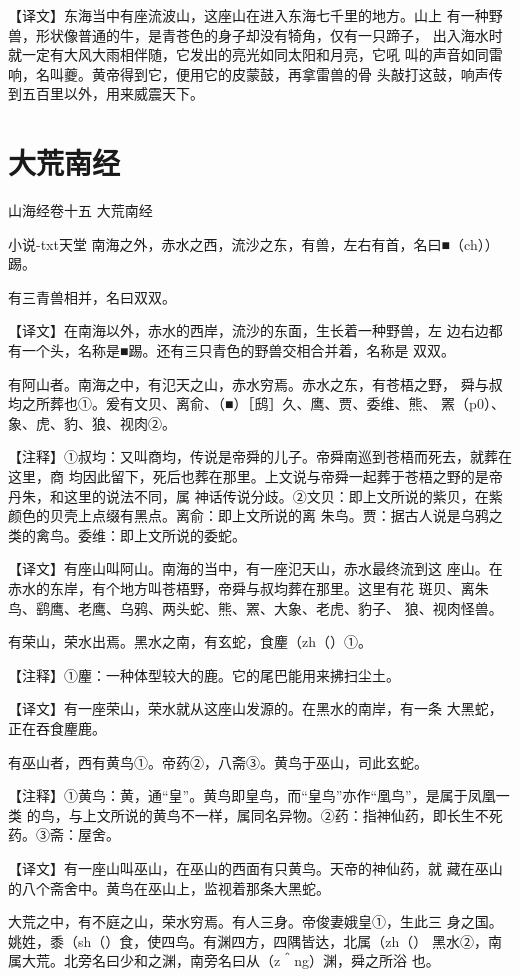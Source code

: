 \documentclass[a4paper,12pt,UTF8,twoside]{ctexbook}
\begin{document}
【译文】东海当中有座流波山，这座山在进入东海七千里的地方。山上 有一种野兽，形状像普通的牛，是青苍色的身子却没有犄角，仅有一只蹄子， 出入海水时就一定有大风大雨相伴随，它发出的亮光如同太阳和月亮，它吼 叫的声音如同雷响，名叫夔。黄帝得到它，便用它的皮蒙鼓，再拿雷兽的骨 头敲打这鼓，响声传到五百里以外，用来威震天下。

\chapter{大荒南经}

山海经卷十五 大荒南经

小说-txt天堂
南海之外，赤水之西，流沙之东，有兽，左右有首，名曰■（ch））踢。

有三青兽相并，名曰双双。

【译文】在南海以外，赤水的西岸，流沙的东面，生长着一种野兽，左 边右边都有一个头，名称是■踢。还有三只青色的野兽交相合并着，名称是 双双。

有阿山者。南海之中，有氾天之山，赤水穷焉。赤水之东，有苍梧之野， 舜与叔均之所葬也①。爰有文贝、离俞、（■）［鸱］久、鹰、贾、委维、熊、 罴（p0）、象、虎、豹、狼、视肉②。

【注释】①叔均：又叫商均，传说是帝舜的儿子。帝舜南巡到苍梧而死去，就葬在这里，商 均因此留下，死后也葬在那里。上文说与帝舜一起葬于苍梧之野的是帝丹朱，和这里的说法不同，属 神话传说分歧。②文贝：即上文所说的紫贝，在紫颜色的贝壳上点缀有黑点。离俞：即上文所说的离 朱鸟。贾：据古人说是乌鸦之类的禽鸟。委维：即上文所说的委蛇。

【译文】有座山叫阿山。南海的当中，有一座氾天山，赤水最终流到这 座山。在赤水的东岸，有个地方叫苍梧野，帝舜与叔均葬在那里。这里有花 斑贝、离朱鸟、鹞鹰、老鹰、乌鸦、两头蛇、熊、罴、大象、老虎、豹子、 狼、视肉怪兽。

有荣山，荣水出焉。黑水之南，有玄蛇，食麈（zh（）①。

【注释】①麈：一种体型较大的鹿。它的尾巴能用来拂扫尘土。

【译文】有一座荣山，荣水就从这座山发源的。在黑水的南岸，有一条 大黑蛇，正在吞食麈鹿。

有巫山者，西有黄鸟①。帝药②，八斋③。黄鸟于巫山，司此玄蛇。

【注释】①黄鸟：黄，通“皇”。黄鸟即皇鸟，而“皇鸟”亦作“凰鸟”，是属于凤凰一类 的鸟，与上文所说的黄鸟不一样，属同名异物。②药：指神仙药，即长生不死药。③斋：屋舍。

【译文】有一座山叫巫山，在巫山的西面有只黄鸟。天帝的神仙药，就 藏在巫山的八个斋舍中。黄鸟在巫山上，监视着那条大黑蛇。

大荒之中，有不庭之山，荣水穷焉。有人三身。帝俊妻娥皇①，生此三 身之国。姚姓，黍（sh（）食，使四鸟。有渊四方，四隅皆达，北属（zh（） 黑水②，南属大荒。北旁名曰少和之渊，南旁名曰从（z＾ng）渊，舜之所浴 也。
\end{document}
